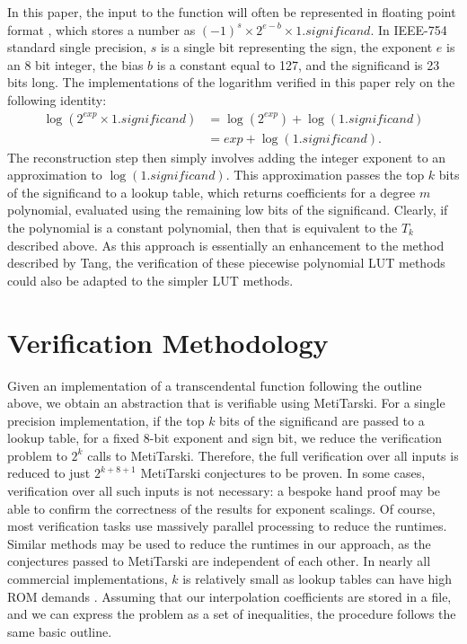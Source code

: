 \documentclass{fac}
\begin{document}
In this paper, the input to the function will often be represented in floating point format \cite{goldberg1991every}, which stores a number as $(-1)^{s} \times 2^{e-b} \times 1.\textit{significand}$. In IEEE-754 standard single precision, $s$ is a single bit representing the sign, the exponent $e$ is an 8 bit integer, the bias $b$ is a constant equal to 127, and the significand is 23 bits long. The implementations of the logarithm verified in this paper rely on the following identity:
\begin{align} 
    \log(2^{\textit{exp}} \times 1.\textit{significand}) &= \log(2^{\textit{exp}}) + \log(1.\textit{significand}) \label{eqn:log_float_1}\\
                                                &= \textit{exp} + \log(1.\textit{significand}).\label{eqn:log_float_2}
\end{align}
The reconstruction step then simply involves adding the integer exponent to an approximation to $\log(1.\textit{significand})$. This approximation passes the top $k$ bits of the significand to a lookup table, which returns coefficients for a degree $m$ polynomial, evaluated using the remaining low bits of the significand. Clearly, if the polynomial is a constant polynomial, then that is equivalent to the $T_k$ described above. As this approach is essentially an enhancement to the method described by Tang, the verification of these piecewise polynomial LUT methods could also be adapted to the simpler LUT methods.


\section{Verification Methodology}
\label{Method}
Given an implementation of a transcendental function following the outline above, we obtain an abstraction that is verifiable using MetiTarski. For a single precision implementation, if the top $k$ bits of the significand are passed to a lookup table, for a fixed 8-bit exponent and sign bit, we reduce the verification problem to $2^k$ calls to MetiTarski. Therefore, the  full verification over all inputs is reduced to just $2^{k+8+1}$ MetiTarski conjectures to be proven. In some cases, verification over all such inputs is not necessary: a bespoke hand proof may be able to confirm the correctness of the results for exponent scalings. Of course, most verification tasks use massively parallel processing to reduce the runtimes. Similar methods may be used to reduce the runtimes in our approach, as the conjectures passed to MetiTarski are independent of each other. In nearly all commercial implementations, $k$ is relatively small as lookup tables can have high ROM demands \cite{strollo2011elementary}. Assuming that our interpolation coefficients are stored in a file, and we can express the problem as a set of inequalities, the procedure follows the same basic outline. \\
\end{document}
